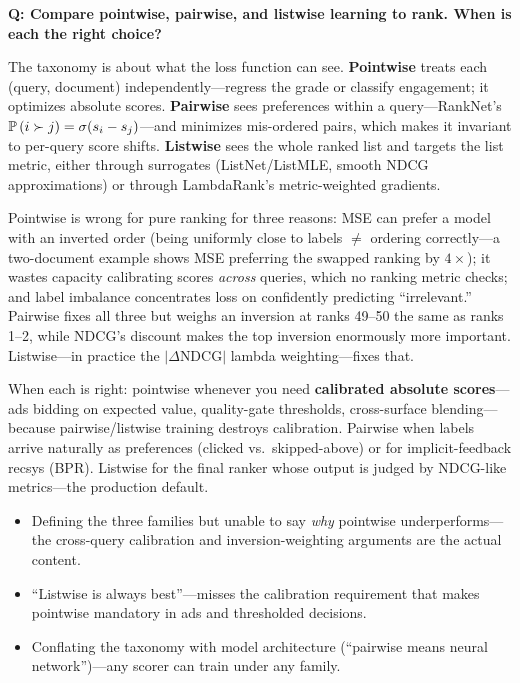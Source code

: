\begin{interviewq}
\textbf{Q: Compare pointwise, pairwise, and listwise learning to rank. When is each the right choice?}

 \quad {} \quad \badgefreq{\freqmed}

\stronganswer

The taxonomy is about what the loss function can see. \textbf{Pointwise} treats each (query, document) independently---regress the grade or classify engagement; it optimizes absolute scores. \textbf{Pairwise} sees preferences within a query---RankNet's $\mathbb{P}\left(i \succ j\right) = \sigma(s_i - s_j)$---and minimizes mis-ordered pairs, which makes it invariant to per-query score shifts. \textbf{Listwise} sees the whole ranked list and targets the list metric, either through surrogates (ListNet/ListMLE, smooth NDCG approximations) or through LambdaRank's metric-weighted gradients.

Pointwise is wrong for pure ranking for three reasons: MSE can prefer a model with an inverted order (being uniformly close to labels $\neq$ ordering correctly---a two-document example shows MSE preferring the swapped ranking by $4\times$); it wastes capacity calibrating scores \textit{across} queries, which no ranking metric checks; and label imbalance concentrates loss on confidently predicting ``irrelevant.'' Pairwise fixes all three but weighs an inversion at ranks 49--50 the same as ranks 1--2, while NDCG's discount makes the top inversion enormously more important. Listwise---in practice the $|\Delta\text{NDCG}|$ lambda weighting---fixes that.

When each is right: pointwise whenever you need \textbf{calibrated absolute scores}---ads bidding on expected value, quality-gate thresholds, cross-surface blending---because pairwise/listwise training destroys calibration. Pairwise when labels arrive naturally as preferences (clicked vs.\ skipped-above) or for implicit-feedback recsys (BPR). Listwise for the final ranker whose output is judged by NDCG-like metrics---the production default.

\redflags
\begin{itemize}
    \item Defining the three families but unable to say \textit{why} pointwise underperforms---the cross-query calibration and inversion-weighting arguments are the actual content.
    \item ``Listwise is always best''---misses the calibration requirement that makes pointwise mandatory in ads and thresholded decisions.
    \item Conflating the taxonomy with model architecture (``pairwise means neural network'')---any scorer can train under any family.
\end{itemize}


\end{interviewq}
